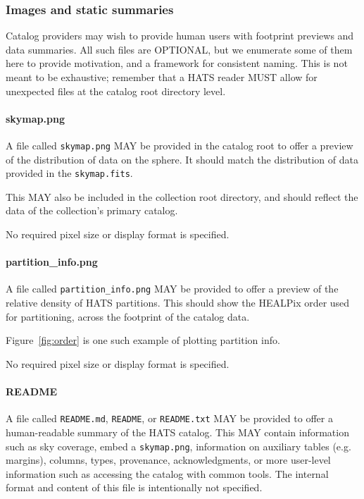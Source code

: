 \documentclass[11pt,a4paper]{ivoa}
\begin{document}
\subsubsection{Images and static summaries}

Catalog providers may wish to provide human users with footprint previews and data summaries.
All such files are OPTIONAL, but we enumerate some of them here to provide motivation, and a framework for consistent naming.
This is not meant to be exhaustive; remember that a HATS reader MUST allow for unexpected files at the catalog root directory level.

\paragraph{skymap.png} 

A file called \texttt{skymap.png} MAY be provided in the catalog root to offer a preview of the distribution of data on the sphere. 
It should match the distribution of data provided in the \texttt{skymap.fits}.

This MAY also be included in the collection root directory, and should reflect the data of the collection's primary catalog.

No required pixel size or display format is specified.

\paragraph{partition\_info.png} 

A file called \texttt{partition\_info.png} MAY be provided to offer a preview of the relative density of HATS partitions. 
This should show the HEALPix order used for partitioning, across the footprint of the catalog data.

Figure~\ref{fig:order} is one such example of plotting partition info.

No required pixel size or display format is specified.

\paragraph{README}

A file called \texttt{README.md}, \texttt{README}, or \texttt{README.txt} MAY be provided to offer a human-readable summary of the HATS catalog.
This MAY contain information such as sky coverage, embed a \texttt{skymap.png}, information on auxiliary tables (e.g. margins), columns, types, 
provenance, acknowledgments, or more user-level information such as accessing the catalog with common tools.
The internal format and content of this file is intentionally not specified.
\end{document}
